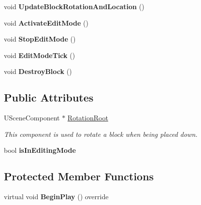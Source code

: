 \begin{DoxyCompactItemize}
void {\bfseries Update\+Block\+Rotation\+And\+Location} ()
\item 
\mbox{\label{class_a_t_t___block_a05ee3aeadfd9b16a5df500f3114b1b7e}} 
void {\bfseries Activate\+Edit\+Mode} ()
\item 
\mbox{\label{class_a_t_t___block_a52432c950b1ddd0ae9cda606e3789152}} 
void {\bfseries Stop\+Edit\+Mode} ()
\item 
\mbox{\label{class_a_t_t___block_a6b324e2c43cf787da046c9a807883774}} 
void {\bfseries Edit\+Mode\+Tick} ()
\item 
\mbox{\label{class_a_t_t___block_a48e348cfe5ba64084b085368287bfd4b}} 
void {\bfseries Destroy\+Block} ()
\end{DoxyCompactItemize}
\subsection*{Public Attributes}
\begin{DoxyCompactItemize}
\item 
U\+Scene\+Component $\ast$ \mbox{\hyperlink{class_a_t_t___block_ab40e055cf024e6c2a96c8351fc76395d}{Rotation\+Root}}
\begin{DoxyCompactList}\small\item\em This component is used to rotate a block when being placed down. \end{DoxyCompactList}\item 
\mbox{\label{class_a_t_t___block_ae4d07bbeabb7b7000315385a692b1d7d}} 
bool {\bfseries is\+In\+Editing\+Mode}
\end{DoxyCompactItemize}
\subsection*{Protected Member Functions}
\begin{DoxyCompactItemize}
\item 
\mbox{\label{class_a_t_t___block_a8912f1c75c3bf0ccbbb06236d920491d}} 
virtual void {\bfseries Begin\+Play} () override
\end{DoxyCompactItemize}
